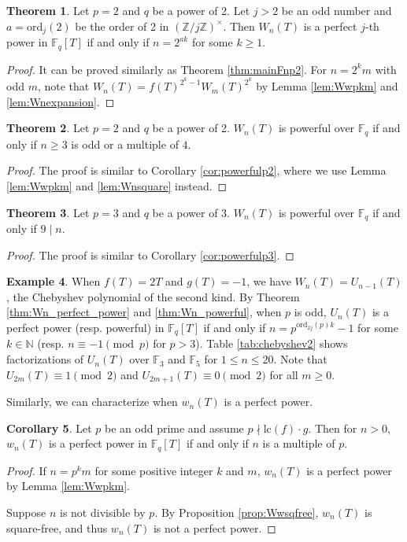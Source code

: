 \documentclass[letterpaper, 10pt]{article}
\newcommand{\lc}{\mathrm{lc}}
\newcommand{\bF}{\mathbb{F}}
\newcommand{\bN}{\mathbb{N}}
\newcommand{\bZ}{\mathbb{Z}}
\newcommand{\1}{\mathds{1}}	%
\theoremstyle{definition}
\newtheorem{theorem}{Theorem}[section]
\newtheorem{corollary}[theorem]{Corollary}
\newtheorem{example}[theorem]{Example}
\theoremstyle{remark}
\begin{document}
\begin{theorem}
    Let $p = 2$ and $q$ be a power of 2.
    Let $j > 2$ be an odd number and $a = \mathrm{ord}_j(2)$ be the order of 2 in $(\bZ / j\bZ)^\times$.
    Then $W_n(T)$ is a perfect $j$-th power in $\bF_q[T]$ if and only if $n = 2^{ak}$ for some $k \ge 1$.
\end{theorem}
\begin{proof}
    It can be proved similarly as Theorem \ref{thm:mainFnp2}.
    For $n = 2^k m$ with odd $m$, note that $W_n(T) = f(T)^{2^k - 1} W_m(T)^{2^k}$ by Lemma \ref{lem:Wwpkm} and \ref{lem:Wnexpansion}.
\end{proof}

\begin{theorem}
    Let $p = 2$ and $q$ be a power of 2.
    $W_n(T)$ is powerful over $\bF_q$ if and only if $n \ge 3$ is odd or a multiple of $4$.
\end{theorem}
\begin{proof}
    The proof is similar to Corollary \ref{cor:powerfulp2}, where we use Lemma \ref{lem:Wwpkm} and \ref{lem:Wnsquare} instead.
\end{proof}

\begin{theorem}
    Let $p = 3$ and $q$ be a power of 3.
    $W_n(T)$ is powerful over $\bF_q$ if and only if $9 \mid n$.
\end{theorem}
\begin{proof}
    The proof is similar to Corollary \ref{cor:powerfulp3}.
\end{proof}

\begin{example}
\label{ex:chebyshev2}
    When $f(T) = 2T$ and $g(T) = -1$, we have $W_n(T) = U_{n-1}(T)$, the Chebyshev polynomial of the second kind.
    By Theorem \ref{thm:Wn_perfect_power} and \ref{thm:Wn_powerful}, when $p$ is odd, $U_n(T)$ is a perfect power (resp. powerful) in $\bF_q[T]$ if and only if $n = p^{\mathrm{ord}_{2j}(p)k} - 1$ for some $k \in \bN$ (resp. $n \equiv -1 \pmod{p}$ for $p > 3$).
    Table \ref{tab:chebyshev2} shows factorizations of $U_n(T)$ over $\bF_3$ and $\bF_5$ for $1 \le n \le 20$.
    Note that $U_{2m}(T) \equiv 1 \pmod{2}$ and $U_{2m+1}(T) \equiv 0 \pmod{2}$ for all $m \ge 0$.
\end{example}


Similarly, we can characterize when $w_n(T)$ is a perfect power.
\begin{corollary}
\label{cor:wn_perfect_power}
    Let $p$ be an odd prime and assume $p \nmid \lc (f) \cdot g$. Then for $n > 0$, $w_n(T)$ is a perfect power in $\mathbb{F}_q[T]$ if and only if $n$ is a multiple of $p$.
\end{corollary}
\begin{proof}
    If $n = p^k m$ for some positive integer $k$ and $m$, $w_n(T)$ is a perfect power by Lemma \ref{lem:Wwpkm}.
    
    Suppose $n$ is not divisible by $p$. By Proposition \ref{prop:Wwsqfree}, $w_n(T)$ is square-free, and thus $w_n(T)$ is not a perfect power.
\end{proof}
\end{document}
